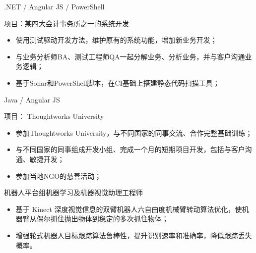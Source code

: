 \documentclass{resume}
\begin{document}
.NET / Angular JS / PowerShell

项目：某四大会计事务所之一的系统开发
\begin{itemize}
  \item 使用测试驱动开发方法，维护原有的系统功能，增加新业务开发；
  \item 与业务分析师BA、测试工程师QA一起分解业务、分析业务，并与客户沟通业务逻辑；
  \item 基于Sonar和PowerShell脚本，在CI基础上搭建静态代码扫描工具；
\end{itemize}

Java / Angular JS

项目： Thoughtworks University
\begin{itemize}
  \item 参加Thoughtworks University，与不同国家的同事交流、合作完整基础训练；
  \item 与不同国家的同事组成开发小组、完成一个月的短期项目开发，包括与客户沟通、敏捷开发；
  \item 参加当地NGO的慈善活动；
\end{itemize}

机器人平台组机器学习及机器视觉助理工程师
\begin{itemize}
  \item 基于 Kinect 深度视觉信息的双臂机器人六自由度机械臂转动算法优化，使机器臂从偶尔抓住抛出物体到稳定的多次抓住物体；
  \item 增强轮式机器人目标跟踪算法鲁棒性，提升识别速率和准确率，降低跟踪丢失概率。
\end{itemize}


\end{document}
